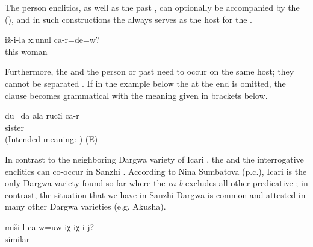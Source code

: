 The person enclitics, as well as the past , can optionally be accompanied by the  (), and in such constructions the  always serves as the host for the  . 

%
\begin{exe}
	\ex	\label{ex:‎‎‎Are you his wife}
	\gll	iž-i-la	xːunul	ca-r=de=w?\\
		this	woman	\\
	\glt	{}
\end{exe}

Furthermore, the  and the person  or past  need to occur on the same host; they cannot be separated . If in the example below the  at the end is omitted, the clause becomes grammatical with the meaning given in brackets below. 
%
\begin{exe}
	\ex	\label{ex:It is me who is your sister.}
	\gll	*du=da	ala	rucːi	ca-r\\
				sister	\\
	\glt	(Intended meaning: ) (E)
\end{exe}

In contrast to the neighboring Dargwa variety of Icari \citep[138]{Sumbatova.Mutalov2003}, the  and the interrogative enclitics can co-occur in Sanzhi . According to Nina Sumbatova (p.c.), Icari is the only Dargwa variety found so far where the  \textit{ca-b} excludes all other predicative ; in contrast, the situation that we have in Sanzhi Dargwa is common and attested in many other Dargwa varieties (e.g. Akusha). 

\begin{exe}
	\ex	\label{ex:Is this similar to himSyntax}
	\gll	miši-l	ca-w=uw	iχ	iχ-i-j?\\
		similar		\tsc{dem.down}	\\
	\glt	{}
\end{exe}

